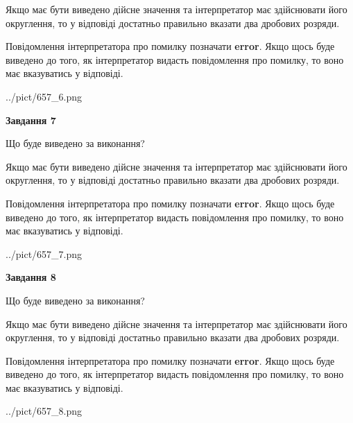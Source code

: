 \documentclass[12pt, ukrainian]{article}
\begin{document}
{\begin {Large}
Якщо має бути виведено дійсне значення та інтерпретатор має здійснювати його округлення, 
то у відповіді достатньо правильно вказати два дробових розряди.

Повідомлення інтерпретатора про помилку позначати \textbf{error}.
Якщо щось буде виведено до того, як інтерпретатор видасть повідомлення про помилку, 
то воно має вказуватись у відповіді. \par

\begin{center}
	{../pict/657_6.png}
\end{center}
\newpage

{\begin {center}\textbf{Завдання 7}\end {center}}\par
Що буде виведено за виконання? \par

Якщо має бути виведено дійсне значення та інтерпретатор має здійснювати його округлення, 
то у відповіді достатньо правильно вказати два дробових розряди.

Повідомлення інтерпретатора про помилку позначати \textbf{error}.
Якщо щось буде виведено до того, як інтерпретатор видасть повідомлення про помилку, 
то воно має вказуватись у відповіді. \par

\begin{center}
	{../pict/657_7.png}
\end{center}
\newpage

{\begin {center}\textbf{Завдання 8}\end {center}}\par
Що буде виведено за виконання? \par

Якщо має бути виведено дійсне значення та інтерпретатор має здійснювати його округлення, 
то у відповіді достатньо правильно вказати два дробових розряди.

Повідомлення інтерпретатора про помилку позначати \textbf{error}.
Якщо щось буде виведено до того, як інтерпретатор видасть повідомлення про помилку, 
то воно має вказуватись у відповіді. \par

\begin{center}
	{../pict/657_8.png}
\end{center}
\newpage


\end{Large}}
\end{document}
